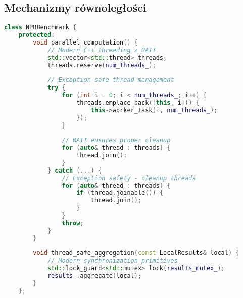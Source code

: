 \subsection{Mechanizmy równoległości}
\begin{lstlisting}[language=C++, caption={Implementacja nowoczesnego C++ - równoległość}, label={lst:modern-cpp-parallelism}]
class NPBBenchmark {
    protected:
        void parallel_computation() {
            // Modern C++ threading z RAII
            std::vector<std::thread> threads;
            threads.reserve(num_threads_);
            
            // Exception-safe thread management
            try {
                for (int i = 0; i < num_threads_; i++) {
                    threads.emplace_back([this, i]() {
                        this->worker_task(i, num_threads_);
                    });
                }
                
                // RAII ensures proper cleanup
                for (auto& thread : threads) {
                    thread.join();
                }
            } catch (...) {
                // Exception safety - cleanup threads
                for (auto& thread : threads) {
                    if (thread.joinable()) {
                        thread.join();
                    }
                }
                throw;
            }
        }
        
        void thread_safe_aggregation(const LocalResults& local) {
            // Modern synchronization primitives
            std::lock_guard<std::mutex> lock(results_mutex_);
            results_.aggregate(local);
        }
    };
\end{lstlisting}

